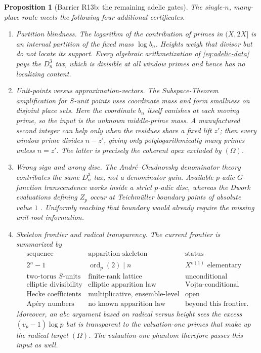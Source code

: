 \documentclass[11pt]{amsart}
\theoremstyle{plain}
\newtheorem{proposition}{Proposition}
\theoremstyle{remark}
\begin{document}
\begin{proposition}[Barrier R13b: the remaining adelic gates]
\label{prop:barrier-adelic}
The single-$n$, many-place route meets the following four additional
certificates.
\begin{enumerate}
\item \emph{Partition blindness.}  The logarithm of the contribution
of primes in $(X,2X]$ is an internal partition of the fixed mass
$\log b_n$.  Heights weigh that divisor but do not locate its support.
Every algebraic arithmetization of \eqref{eq:adelic-data} pays the
$D_n^3$ tax, which is divisible at all window primes and hence has no
localizing content.
\item \emph{Unit-points versus approximation-vectors.}  The
Subspace-Theorem amplification for $S$-unit points uses coordinate
mass and form smallness on disjoint place sets.  Here the coordinate
$b_n$ itself vanishes at each moving prime, so the input is the unknown
middle-prime mass.  A manufactured second integer can help only when
the residues share a fixed lift $z'$; then every window prime divides
$n-z'$, giving only polylogarithmically many primes unless $n=z'$.
The latter is precisely the coherent apex excluded by $(\Omega)$.
\item \emph{Wrong sign and wrong disc.}  The
Andr\'e--Chudnovsky denominator theory contributes the same $D_n^3$
tax, not a denominator gain.  Available $p$-adic $G$-function
transcendence works inside a strict $p$-adic disc, whereas the Dwork
evaluations defining $Z_p$ occur at Teichm\"uller boundary points of
absolute value $1$ \cite{Andre1989,Chudnovsky1985,Dwork1969}.
Uniformly reaching that boundary would already require the missing
unit-root information.
\item \emph{Skeleton frontier and radical transparency.}  The current
frontier is summarized by
\[
\begin{array}{c|c|c}
\text{sequence}&\text{apparition skeleton}&\text{status}\\ \hline
2^n-1&\operatorname{ord}_p(2)\mid n&X^{o(1)}\text{ elementary}\\
\text{two-torus $S$-units}&\text{finite-rank lattice}&
 \text{unconditional}\\
\text{elliptic divisibility}&\text{elliptic apparition law}&
 \text{Vojta-conditional}\\
\text{Hecke coefficients}&\text{multiplicative, ensemble-level}&
 \text{open}\\
\text{Ap\'ery numbers}&\text{no known apparition law}&
 \text{beyond this frontier}.
\end{array}
\tag{8.17}\label{eq:skeleton-frontier}
\]
Moreover, an $abc$ argument based on radical versus height sees the
excess $(v_p-1)\log p$ but is transparent to the valuation-one primes
that make up the radical target $(\Omega)$.  The valuation-one phantom
therefore passes this input as well.
\end{enumerate}
\end{proposition}
\end{document}
